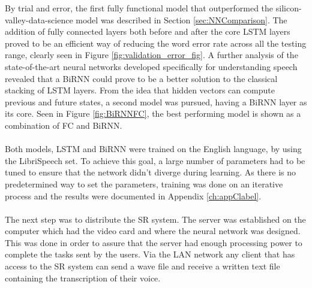 By trial and error, the first fully functional model that outperformed the silicon-valley-data-science model was described in Section \ref{sec:NNComparison}. The addition of fully connected layers both before and after the core LSTM layers proved to be an efficient way of reducing the word error rate across all the testing range, clearly seen in Figure \ref{fig:validation_error_fig}. A further analysis of the state-of-the-art neural networks developed specifically for understanding speech revealed that a BiRNN could prove to be a better solution to the classical stacking of LSTM layers. From the idea that hidden vectors can compute previous and future states, a second model was pursued, having a BiRNN layer as its core. Seen in Figure \ref{fig:BiRNNFC}, the best performing model is shown as a combination of FC and BiRNN. \\\\
Both models, LSTM and BiRNN were trained on the English language, by using the LibriSpeech set. To achieve this goal, a large number of parameters had to be tuned to ensure that the network didn't diverge during learning. As there is no predetermined way to set the parameters, training was done on an iterative process and the results were documented in Appendix \ref{ch:appClabel}.\\\\
The next step was to distribute the SR system. The server was established on the computer which had the video card and where the neural network was designed. This was done in order to assure that the server had enough processing power to complete the tasks sent by the users. Via the LAN network any client that has access to the SR system can send a wave file and receive a written text file containing the transcription of their voice.

